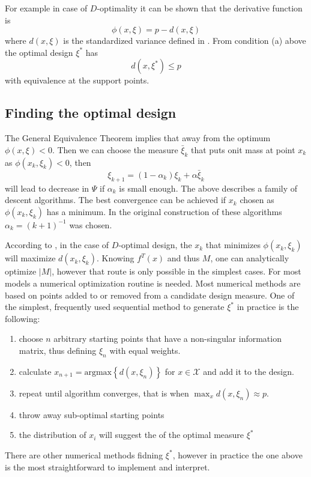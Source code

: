 \documentclass[12pt]{iopart}
\begin{document}
For example in case of $D$-optimality it can be shown that the derivative function  is
\begin{equation}
\phi(x, \xi) = p - d(x, \xi)
\label{eq:phicond}
\end{equation}
where $d(x, \xi)$ is the standardized variance defined in . From condition (a) above the optimal design $\xi^*$ has
\begin{equation}
d(x, \xi^*) \leq p
\end{equation}
with equivalence at the support points.

\subsection{Finding the optimal design}

The General Equivalence Theorem implies that away from the optimum $\phi(x, \xi) < 0$. Then we can choose the measure $\bar \xi_k$ that puts onit mass at point $x_k$ as $\phi(x_k, \xi_k) < 0$, then
\begin{equation}
\xi_{k+1} = (1-\alpha_k) \xi_k + \alpha \bar \xi_k
\end{equation}
will lead to decrease in $\Psi$ if $\alpha_k$ is small enough. The above describes a family of descent algorithms. The best convergence can be achieved if $x_k$ chosen as $\phi(x_k, \xi_k)$ has a minimum. In the original construction of these algorithms $\alpha_k = (k+1)^{-1}$ was chosen.

According to , in the case of $D$-optimal design, the $x_k$ that minimizes $\phi(x_k, \xi_k)$ will maximize $d(x_k, \xi_k)$. Knowing $f^T(x)$ and thus $M$, one can analytically optimize $|M|$, however that route is only possible in the simplest cases. For most models a numerical optimization routine is needed. Most numerical methods are based on points added to or removed from a candidate design measure. One of the simplest, frequently used sequential method to generate $\xi^*$ in practice is the following:
\begin{enumerate}
\item choose $n$ arbitrary starting points that have a non-singular information matrix, thus defining $\xi_n$ with equal weights.
\item calculate $x_{n+1} = \mathrm{argmax}\left\{d(x, \xi_n)\right\}$ for $x \in \mathcal{X}$ and add it to the design.
\item repeat until algorithm converges, that is when $\max_{x} d(x, \xi_{n}) \approx p$.
\item throw away sub-optimal starting points
\item the distribution of $x_i$ will suggest the of the optimal measure $\xi^*$
\end{enumerate}
There are other numerical methods fidning $\xi^*$, however in practice the one above is the most straightforward to implement and interpret.
\end{document}

